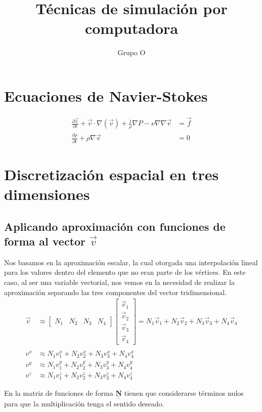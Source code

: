 \documentclass[12pt]{article}
\title{T\'ecnicas de simulaci\'on por computadora}
\author{Grupo O}
\def\doubleunderline#1{\underline{\underline{#1}}}
\def\diffp[#1]#2{\frac{\partial#1}{\partial#2}}
\newcommand{\vv}{\vec{v}}
\newcommand{\vf}{\vec{f}}
\newcommand{\nb}{\doubleunderline{\mathbf{N}}}
\begin{document}
\maketitle
\vspace{3cm}
\section{Ecuaciones de Navier-Stokes}
\begin{align*}
	\diffp[\vv]{t} + \vv \cdot \nabla (\vv) + \frac{1}{\rho} \nabla P - \nu \nabla \nabla \vv &= \vf \\
	\diffp[\rho]{t} + \rho \nabla \vv &= 0
\end{align*}

\section{Discretizaci\'on espacial en tres dimensiones}

\subsection{Aplicando aproximaci\'on con funciones de forma al vector $\vv$}
Nos basamos en la aproximaci\'on escalar, la cual otorgada una interpolaci\'on lineal
para los valores dentro del elemento que no eran parte de los v\'ertices. En este caso, al ser una
variable vectorial, nos vemos en la necesidad de realizar la aproximaci\'on separando las tres componentes
del vector tridimensional.
\begin{align*}
\vv &\approx \begin{bmatrix} N_1 & N_2 & N_3 & N_4 \end{bmatrix} \begin{bmatrix} \vv_1 \\ \vv_2 \\ \vv_3 \\ \vv_4 \end{bmatrix} = N_1 \vv_1 + N_2 \vv_2 + N_3 \vv_3 + N_4 \vv_4 \\ \\
v^{x} &\approx N_1v^{x}_{1} +  N_2v^{x}_{2} +  N_3v^{x}_{3} +  N_4v^{x}_{4} \\
v^{y} &\approx N_1v^{y}_{1} +  N_2v^{y}_{2} +  N_3v^{y}_{3} +  N_4v^{y}_{4} \\
v^{z} &\approx N_1v^{z}_{1} +  N_2v^{z}_{2} +  N_3v^{z}_{3} +  N_4v^{z}_{4}
\end{align*}

En la matriz de funciones de forma $\nb$ tienen que considerarse t\'erminos nulos para que la multiplicaci\'on tenga el sentido deseado.
\end{document}
